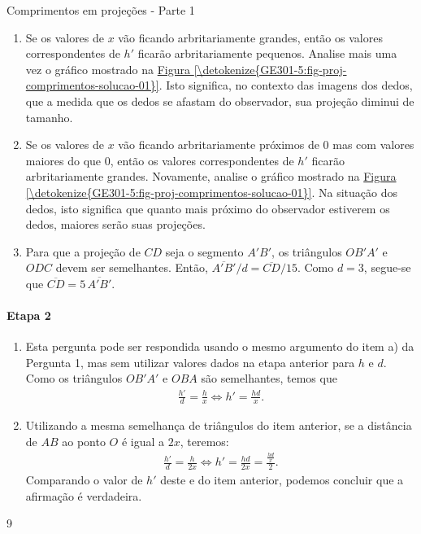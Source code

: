 \begin{answer}{Comprimentos em projeções - Parte 1}
{\begin{enumerate}
\item {} 
Se os valores de \(x\) vão ficando arbritariamente grandes, então os valores correspondentes de \(h'\) ficarão arbritariamente pequenos. Analise mais uma vez o gráfico mostrado na \hyperref[\detokenize{GE301-5:fig-proj-comprimentos-solucao-01}]{Figura \ref{\detokenize{GE301-5:fig-proj-comprimentos-solucao-01}}}. Isto significa, no contexto das imagens dos dedos, que a medida que os dedos se afastam do observador, sua projeção diminui de tamanho.

\item {} 
Se os valores de \(x\) vão ficando arbritariamente próximos de \(0\) mas com valores maiores do que \(0\), então os valores correspondentes de \(h'\) ficarão arbritariamente grandes. Novamente, analise o gráfico mostrado na \hyperref[\detokenize{GE301-5:fig-proj-comprimentos-solucao-01}]{Figura \ref{\detokenize{GE301-5:fig-proj-comprimentos-solucao-01}}}. Na situação dos dedos, isto significa que quanto mais próximo do observador estiverem os dedos, maiores serão suas projeções.

\item {} 
Para que a projeção de \(CD\) seja o segmento \(A'B'\), os triângulos \(OB'A'\) e \(ODC\) devem ser semelhantes. Então, \(\overline{A'B'}/d = \overline{CD}/15\). Como \(d = 3\), segue-se que \(\overline{CD} = 5 \, \overline{A'B'}\).
\end{enumerate}

\paragraph{Etapa 2}

\begin{enumerate}
\item {} 
Esta pergunta pode ser respondida usando o mesmo argumento do item a) da Pergunta 1, mas sem utilizar valores dados na etapa anterior para \(h\) e \(d\). Como os triângulos \(OB'A'\) e \(OBA\) são semelhantes, temos que
\begin{equation*}
\begin{split}\frac{h'}{d}=\frac{h}{x} \Leftrightarrow h'=\frac{hd}{x}.\end{split}
\end{equation*}
\item {} 
Utilizando a mesma semelhança de triângulos do item anterior, se a distância de \(AB\) ao ponto \(O\) é igual a \(2x\), teremos:
\begin{equation*}
\begin{split}\frac{h'}{d}=\frac{h}{2x} \Leftrightarrow h'=\frac{hd}{2x}=\frac{\frac{hd}{x}}2.\end{split}
\end{equation*}
Comparando o valor de \(h'\) deste e do item anterior, podemos concluir que a afirmação é verdadeira.

\end{enumerate}
}{9}
\end{answer}
